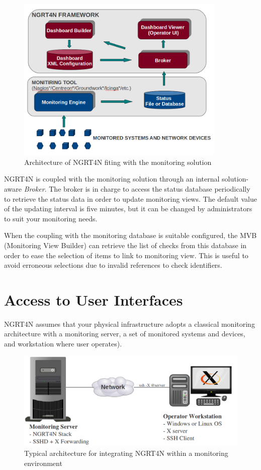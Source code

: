 \documentclass[a4paper,9pt]{article}
\begin{document}
\begin{figure}[!t]
\centering
\includegraphics[width=10cm]{images/software-integration.png}
\caption{Architecture of NGRT4N fiting with the monitoring solution}
\end{figure} 

NGRT4N is coupled with the monitoring solution through an internal solution-aware \emph{Broker}. The broker is in charge to access the status database periodically to retrieve the status data in order to update monitoring views. The default value of the updating interval is five minutes, but it can be changed by administrators to suit your monitoring needs. 

When the coupling with the monitoring database is suitable configured, the MVB (Monitoring View Builder) can retrieve the list of checks from this database in order to ease the selection of items to link to monitoring view. This is useful to avoid erroneous selections due to invalid references to check identifiers.


\section{Access to User Interfaces}
NGRT4N assumes that your physical infrastructure adopts a classical monitoring architecture with a monitoring server, a set of monitored systems and devices, and workstation where user operates). 

\begin{figure}
\centering
\includegraphics[width=12cm]{images/physical-integration.png}
\caption{Typical architecture for integrating NGRT4N within a monitoring environment}
\end{figure}
\end{document}
